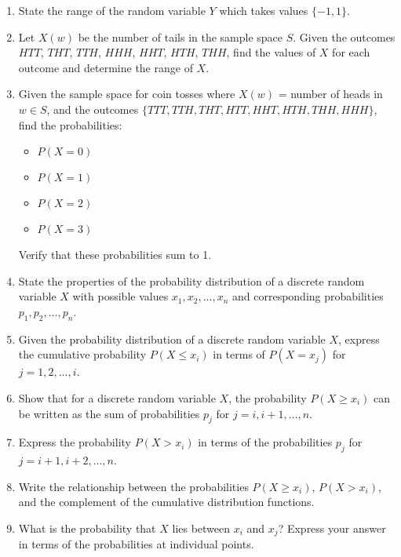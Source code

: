 \documentclass{article}
\begin{document}
\begin{enumerate}
    \item State the range of the random variable \(Y\) which takes values \(\{-1, 1\}\).
    
    \item Let \(X(w)\) be the number of tails in the sample space \(S\). Given the outcomes \(HTT\), \(THT\), \(TTH\), \(HHH\), \(HHT\), \(HTH\), \(THH\), find the values of \(X\) for each outcome and determine the range of \(X\).
    
    \item Given the sample space for coin tosses where \(X(w)\) = number of heads in \(w \in S\), and the outcomes \(\{TTT, TTH, THT, HTT, HHT, HTH, THH, HHH\}\), find the probabilities:
    \begin{itemize}
        \item \(P(X=0)\)
        \item \(P(X=1)\)
        \item \(P(X=2)\)
        \item \(P(X=3)\)
    \end{itemize}
    Verify that these probabilities sum to 1.
    
    \item State the properties of the probability distribution of a discrete random variable \(X\) with possible values \(x_1, x_2, \dots, x_n\) and corresponding probabilities \(p_1, p_2, \dots, p_n\).
    
    \item Given the probability distribution of a discrete random variable \(X\), express the cumulative probability \(P(X \leq x_i)\) in terms of \(P(X = x_j)\) for \(j=1,2,\dots,i\).
    
    \item Show that for a discrete random variable \(X\), the probability \(P(X \geq x_i)\) can be written as the sum of probabilities \(p_j\) for \(j = i, i+1, \dots, n\).
    
    \item Express the probability \(P(X > x_i)\) in terms of the probabilities \(p_j\) for \(j = i+1, i+2, \dots, n\).
    
    \item Write the relationship between the probabilities \(P(X \geq x_i)\), \(P(X > x_i)\), and the complement of the cumulative distribution functions.
    
    \item What is the probability that \(X\) lies between \(x_i\) and \(x_j\)? Express your answer in terms of the probabilities at individual points.
    

\end{enumerate}
\end{document}

